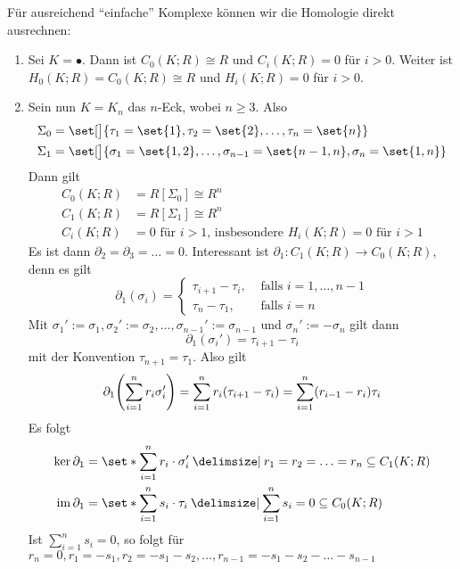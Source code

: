 \begin{beispiel}
	Für ausreichend \enquote{einfache} Komplexe können wir die Homologie direkt ausrechnen:
	\begin{enumerate}[(1)]
		\item Sei $K= \bullet$. Dann ist $C_0(K;R) \cong R$ und $C_i(K;R) = 0$ für $i>0$. Weiter ist $H_0(K;R) = C_0(K;R) \cong R$ und $H_i(K;R) =0$ für $i>0$.
		\item Sein nun $K=K_n$ das $n$-Eck, wobei $n \ge 3$.  Also
		\begin{align*}
			\Sigma_0 &= \set[\big]{\tau_1=\set{1}, \tau_2=\set{2}, \ldots , \tau_n = \set{n} \rule{0cm}{0.9em}} \\
	 		\Sigma_1 &= \set[\big]{\sigma_1 = \set{1,2}, \ldots , \sigma_{n-1} = \set{n-1, n}, \sigma_n=\set{1,n} \rule{0cm}{0.9em}} 
		\end{align*}
		Dann gilt
		\begin{align*}
			C_0(K;R) &= R[\Sigma_0] \cong R^{n} \\
			C_1(K;R) &= R[\Sigma_1] \cong R^{n} \\
			C_i(K;R) &= 0 \text{ für $i>1$, insbesondere } H_i(K;R) = 0 \text{ für } i>1
		\end{align*}
		Es ist dann $\partial_2 = \partial_3 = \ldots  = 0$. Interessant ist $\partial_1 \colon C_1(K;R) \to C_0(K;R)$, denn es gilt
		\[
			\partial_1(\sigma_i) = \begin{cases}
				\tau_{i+1} - \tau_i, &\text{ falls }i=1, \ldots ,n-1\\
				\tau_n - \tau_1 , &\text{ falls } i=n
			\end{cases}
		\]
		Mit $\sigma_1' := \sigma_1, \sigma_2' := \sigma_2, \ldots , \sigma_{n-1}' := \sigma_{n-1}$ und $ \sigma_n' := - \sigma_n$ gilt dann
		\[
			\partial_1 (\sigma_i') = \tau_{i+1} - \tau_i
		\]
		mit der Konvention $\tau_{n+1} = \tau_1$. Also gilt
		\begin{align*}
			\partial_1 \enbrace*{\sum_{i=1}^{n} r_i \sigma_i' } = \sum_{i=1}^{n} r_i \enbrace*{\tau_{i+1}- \tau_i} = \sum_{i=1}^{n} (r_{i-1} - r_i) \tau_i  
		\end{align*}
		Es folgt
		\begin{align*}
			\ker \partial_1 &= \set*{\sum_{i=1}^{n} r_i \cdot \sigma_i' \given r_1=r_2= \ldots =r_n} \subseteq C_1(K;R) \\
			\im \partial_1 &= \set*{\sum_{i=1}^{n} s_i \cdot \tau_i \given \sum_{i=1}^{n} s_i =0} \subseteq C_0(K;R)
		\end{align*}
		Ist $\sum_{i=1}^{n} s_i =0$, so folgt für $r_n=0, r_1 = -s_1, r_2=-s_1 -s_2, \ldots , r_{n-1} = -s_1 - s_2 - \ldots - s_{n-1}$

\end{enumerate}
\end{beispiel}

